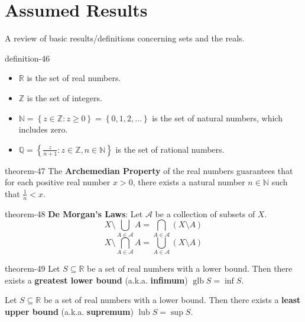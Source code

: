 \documentclass[10pt,]{article}
\newcommand{\terminology}[1]{\textbf{#1}}
\newcommand{\mb}{\mathbb}
\newcommand{\mc}{\mathcal}
\newcommand{\glb}{\operatorname{glb}}
\newcommand{\lub}{\operatorname{lub}}
\newcommand{\setBuilder}[2]{\left\{#1:#2\right\}}
\newcommand{\setList}[1]{\left\{#1\right\}}
\newcommand{\lt}{<}
\begin{document}
\section[{Assumed Results}]{Assumed Results}\label{set-theory}
\hypertarget{p-183}{}%
A review of basic results/definitions concerning sets and the reals.%
\begin{definition}{}{definition-46}%
\leavevmode%
\begin{itemize}[label=\textbullet]
\item{}\(\mb R\) is the set of real numbers.%
\item{}\(\mb Z\) is the set of integers.%
\item{}\(\mb N=\setBuilder{z\in\mb Z}{z\geq 0}=\setList{0,1,2,\dots}\) is the set of natural numbers, which includes zero.%
\item{}\(\mb Q=\setBuilder{\frac{z}{n+1}}{z\in\mb Z,n\in\mb N}\) is the set of rational numbers.%
\end{itemize}
\end{definition}
\begin{theorem}{}{}{theorem-47}%
\hypertarget{p-184}{}%
The \terminology{Archemedian Property} of the real numbers guarantees that for each positive real number \(x>0\), there exists a natural number \(n\in\mb N\) such that \(\frac{1}{n}\lt x\).%
\end{theorem}
\begin{theorem}{}{}{theorem-48}%
\hypertarget{p-185}{}%
\terminology{De Morgan's Laws}: Let \(\mc A\) be a collection of subsets of \(X\).%
%
\begin{equation*}
X\setminus\bigcup_{A\in\mc A}A=\bigcap_{A\in\mc A}(X\setminus A)
\end{equation*}
%
\begin{equation*}
X\setminus\bigcap_{A\in\mc A}A=\bigcup_{A\in\mc A}(X\setminus A)
\end{equation*}
\end{theorem}
\begin{theorem}{}{}{theorem-49}%
\hypertarget{p-186}{}%
Let \(S\subseteq \mb R\) be a set of real numbers with a lower bound. Then there exists a \terminology{greatest lower bound} (a.k.a. \terminology{infimum}) \(\glb S=\inf S\).%
\par
\hypertarget{p-187}{}%
Let \(S\subseteq \mb R\) be a set of real numbers with a lower bound. Then there exists a \terminology{least upper bound} (a.k.a. \terminology{supremum}) \(\lub S=\sup S\).%
\end{theorem}
\end{document}
